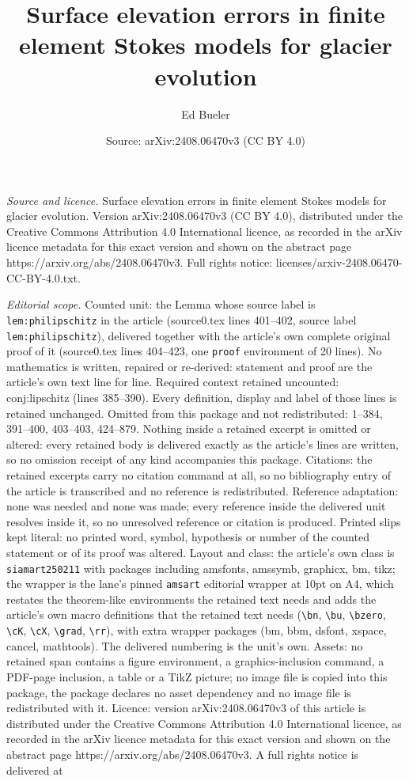 \documentclass[10pt,a4paper]{amsart}
\title[Surface elevation errors in finite element Stokes models for]{Surface elevation errors in finite element Stokes models for glacier evolution}
\author{Ed Bueler}
\date{Source: arXiv:2408.06470v3 (CC BY 4.0)}
\begin{document}
\maketitle

\noindent\emph{Source and licence.} Surface elevation errors in finite element Stokes models for glacier evolution. Version arXiv:2408.06470v3 (CC BY 4.0), distributed under the Creative Commons Attribution 4.0 International licence, as recorded in the arXiv licence metadata for this exact version and shown on the abstract page https://arxiv.org/abs/2408.06470v3. Full rights notice: licenses/arxiv-2408.06470-CC-BY-4.0.txt.\par\smallskip

\noindent\textit{Editorial scope.} Counted unit: the Lemma whose source label is \texttt{lem:philipschitz} in the article (source0.tex lines 401--402, source label \texttt{lem:philipschitz}), delivered together with the article's own complete original proof of it (source0.tex lines 404--423, one \texttt{proof} environment of 20 lines). No mathematics is written, repaired or re-derived: statement and proof are the article's own text line for line. Required context retained uncounted: conj:lipschitz (lines 385--390). Every definition, display and label of those lines is retained unchanged. Omitted from this package and not redistributed: 1--384, 391--400, 403--403, 424--879. Nothing inside a retained excerpt is omitted or altered: every retained body is delivered exactly as the article's lines are written, so no omission receipt of any kind accompanies this package. Citations: the retained excerpts carry no citation command at all, so no bibliography entry of the article is transcribed and no reference is redistributed. Reference adaptation: none was needed and none was made; every reference inside the delivered unit resolves inside it, so no unresolved reference or citation is produced. Printed slips kept literal: no printed word, symbol, hypothesis or number of the counted statement or of its proof was altered. Layout and class: the article's own class is \texttt{siamart250211} with packages including amsfonts, amssymb, graphicx, bm, tikz; the wrapper is the lane's pinned \texttt{amsart} editorial wrapper at 10pt on A4, which restates the theorem-like environments the retained text needs and adds the article's own macro definitions that the retained text needs (\texttt{\textbackslash bn}, \texttt{\textbackslash bu}, \texttt{\textbackslash bzero}, \texttt{\textbackslash cK}, \texttt{\textbackslash cX}, \texttt{\textbackslash grad}, \texttt{\textbackslash rr}), with extra wrapper packages (bm, bbm, dsfont, xspace, cancel, mathtools). The delivered numbering is the unit's own. Assets: no retained span contains a figure environment, a graphics-inclusion command, a PDF-page inclusion, a table or a TikZ picture; no image file is copied into this package, the package declares no asset dependency and no image file is redistributed with it. Licence: version arXiv:2408.06470v3 of this article is distributed under the Creative Commons Attribution 4.0 International licence, as recorded in the arXiv licence metadata for this exact version and shown on the abstract page https://arxiv.org/abs/2408.06470v3. A full rights notice is delivered at 
\end{document}
